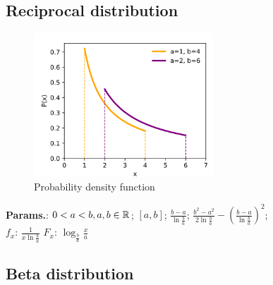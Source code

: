     
        
\subsection{Reciprocal distribution}


    \begin{figure}[H]
        \centering
        \includegraphics[width=0.6\textwidth]{images/Reciprocal pdf.png}
        \caption{Probability density function}
    \end{figure}




    {\color{darkblue} \textbf{Params.}:} {$ 0 < a < b, a, b \in \mathbb{R}$}; {$ [ a , b ] $}; {$\frac{b-a}{\ln\frac ba}$}; {$\frac{b^2-a^2}{2\ln\frac ba}-\left(\frac{b-a}{\ln\frac ba}\right)^2$};\hspace{0.5cm}\\{\color{darkblue} \textbf{$f_x$}:} {$\frac1{x\ln\frac ba}$}{\color{darkblue} \textbf{$F_x$}:} {$\log_{\frac ba}\frac xa$}



    
        
\subsection{Beta distribution}


